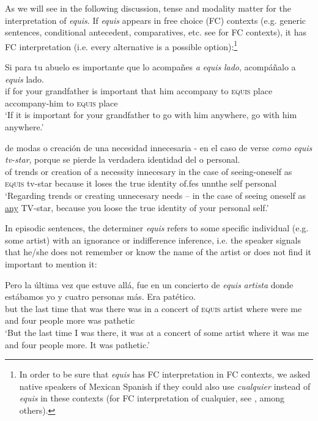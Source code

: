 \documentclass[output=paper]{langsci/langscibook}
\begin{document}
As we will see in the following discussion, tense and modality matter for the interpretation of \textit{equis}. If \textit{equis} appears in free choice (FC) contexts (e.g. generic sentences, conditional antecedent, comparatives, etc. see \citealt{Aloni2010} for FC contexts), it has FC interpretation (i.e. every alternative is a possible option):\footnote{In order to be sure that \textit{equis} has FC interpretation in FC contexts, we asked native speakers of Mexican Spanish if they could also use \textit{cualquier} instead of \textit{equis} in these contexts (for FC interpretation of cualquier, see \citealt{AM2011}, among others).}

\ea
\gll Si para tu abuelo es importante que lo acompañes \textit{a} \textit{equis} \textit{lado}, acompáñalo a \textit{equis} lado.\\
if for your grandfather is important that him accompany to \textsc{equis} place accompany-him to \textsc{equis} place\\
\glt ‘If it is important for your grandfather to go with him anywhere, go with him anywhere.’
\z

\ea
\gll de modas o creación de una necesidad innecesaria - en el caso de verse \textit{como} \textit{equis} \textit{tv-star}, porque se pierde la verdadera identidad del o personal.\\
of trends or creation of a necessity innecesary {} in the case of seeing-oneself as \textsc{equis} tv-star because it	loses the true identity of.fes unnthe self personal\\
\glt ‘Regarding trends or creating unnecesary needs – in the case of seeing oneself as \underline{any} TV-star, because you loose the true identity of your personal self.’
\z

In episodic sentences, the determiner \textit{equis} refers to some specific individual (e.g. some artist) with an ignorance or indifference inference, i.e. the speaker signals that he/she does not remember or know the name of the artist or does not find it important to mention it:

\ea
\gll  Pero la última vez que estuve allá, fue en un concierto de \textit{equis} \textit{artista} donde estábamos yo y cuatro personas más. Era patético.\\
but the last time that was there was in a concert of \textsc{equis} artist where were me and four people more was pathetic
\\
\glt ‘But the last time I was there, it was at a concert of some artist where it was me and four people more. It was pathetic.’
\z
\end{document}

